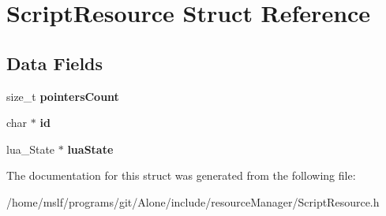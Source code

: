 \hypertarget{struct_script_resource}{}\section{Script\+Resource Struct Reference}
\label{struct_script_resource}
\subsection*{Data Fields}
\begin{DoxyCompactItemize}
\item 
\hypertarget{struct_script_resource_aa058e87a17f5f5079be31c1631ed5f50}{}\label{struct_script_resource_aa058e87a17f5f5079be31c1631ed5f50} 
size\+\_\+t {\bfseries pointers\+Count}
\item 
\hypertarget{struct_script_resource_aecb3b0d045ada529257a2fbf8f829599}{}\label{struct_script_resource_aecb3b0d045ada529257a2fbf8f829599} 
char $\ast$ {\bfseries id}
\item 
\hypertarget{struct_script_resource_a977f3d6715c13c5f13e6134222ffd6f8}{}\label{struct_script_resource_a977f3d6715c13c5f13e6134222ffd6f8} 
lua\+\_\+\+State $\ast$ {\bfseries lua\+State}
\end{DoxyCompactItemize}


The documentation for this struct was generated from the following file\+:\begin{DoxyCompactItemize}
\item 
/home/mslf/programs/git/\+Alone/include/resource\+Manager/Script\+Resource.\+h\end{DoxyCompactItemize}
